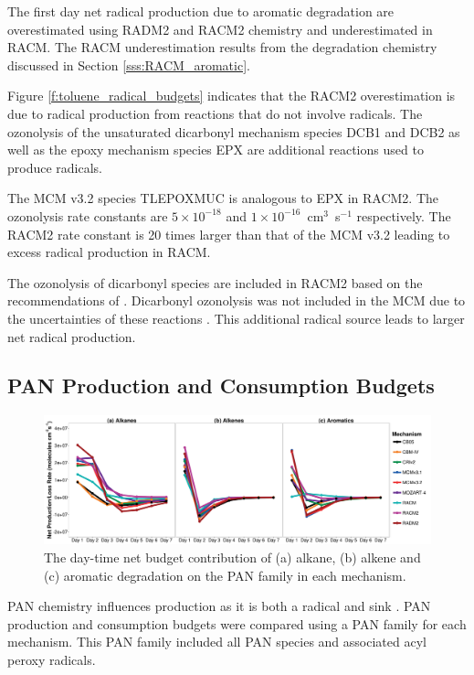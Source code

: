 The first day net radical production due to aromatic degradation are overestimated using RADM2 and RACM2 chemistry and underestimated in RACM. 
The RACM underestimation results from the degradation chemistry discussed in Section \ref{sss:RACM_aromatic}.

Figure \ref{f:toluene_radical_budgets} indicates that the RACM2 overestimation is due to radical production from reactions that do not involve radicals. 
The ozonolysis of the unsaturated dicarbonyl mechanism species DCB1 and DCB2 as well as the epoxy mechanism species EPX are additional reactions used to produce radicals.

The MCM v3.2 species TLEPOXMUC is analogous to EPX in RACM2. 
The ozonolysis rate constants are \mbox{$5 \times 10^{-18}$} and \mbox{$1 \times 10^{-16}$ cm$^3$ s$^{-1}$} respectively. 
The RACM2 rate constant is 20 times larger than that of the MCM v3.2 leading to excess radical production in RACM.

The ozonolysis of dicarbonyl species are included in RACM2 based on the recommendations of \citet{Bierbach:1994}. 
Dicarbonyl ozonolysis was not included in the MCM due to the uncertainties of these reactions \citep{Bloss:2005}.  
This additional radical source leads to larger net radical production.

\subsection{PAN Production and Consumption Budgets} \label{ss:PAN}

\begin{figure}
    \begin{center}
        \includegraphics[width=\textwidth]{img/Net_PAN_budgets}
    \end{center}
    \caption{The day-time net budget contribution of (a) alkane, (b) alkene and (c) aromatic degradation on the PAN family in each mechanism.}
    \label{f:net_PAN}
\end{figure}

PAN chemistry influences  production as it is both a radical and  sink \citep{Fischer:2014}. 
PAN production and consumption budgets were compared using a PAN family for each mechanism. 
This PAN family included all PAN species and associated acyl peroxy radicals.


